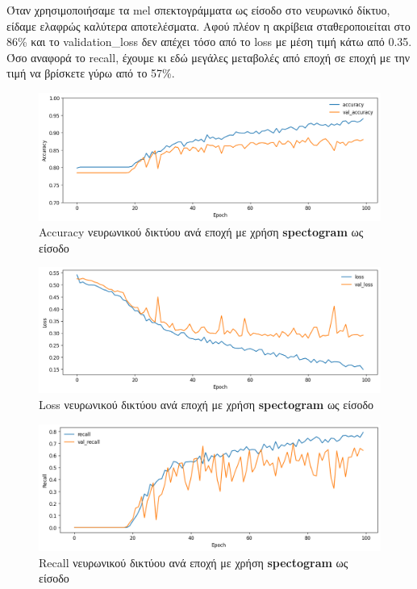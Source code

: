 \documentclass[../main.tex]{subfiles}
\begin{document}
Όταν χρησιμοποιήσαμε τα mel σπεκτογράμματα ως είσοδο στο νευρωνικό δίκτυο,
είδαμε ελαφρώς καλύτερα αποτελέσματα. Αφού πλέον η ακρίβεια σταθεροποιείται στο
86\% και το validation\_loss δεν απέχει τόσο από το loss με μέση τιμή κάτω από
0.35. Όσο αναφορά το recall, έχουμε κι εδώ μεγάλες μεταβολές από εποχή σε εποχή
με την τιμή να βρίσκετε γύρω από το 57\%.

\begin{figure}[H]
	\center
	\includegraphics[width=\textwidth]{../images/spectogram_accuracy.png}
	\caption{Accuracy νευρωνικού δικτύου ανά εποχή με χρήση \textbf{spectogram} ως
		είσοδο}
	\label{spectogram_accuracy}
\end{figure}
\begin{figure}[H]
	\center
	\includegraphics[width=\textwidth]{../images/spectogram_loss.png}
	\caption{Loss νευρωνικού δικτύου ανά εποχή με χρήση \textbf{spectogram} ως
		είσοδο}
	\label{spectogram_loss}
\end{figure}
\begin{figure}[H]
	\center
	\includegraphics[width=\textwidth]{../images/spectogram_recall.png}
	\caption{Recall νευρωνικού δικτύου ανά εποχή με χρήση \textbf{spectogram} ως
		είσοδο}
	\label{spectogram_recall}
\end{figure}
\end{document}

